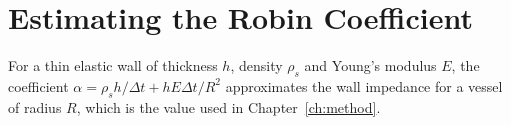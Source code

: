 \chapter{Estimating the Robin Coefficient}
\label{app:a}

For a thin elastic wall of thickness $h$, density $\rho_s$ and Young's modulus $E$, the
coefficient $\alpha = \rho_s h / \Delta t + h E \Delta t / R^2$ approximates the wall impedance
for a vessel of radius $R$, which is the value used in Chapter~\ref{ch:method}.
